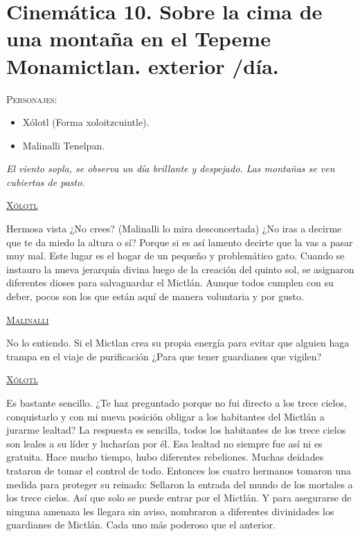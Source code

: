 \documentclass[11pt,letterpaper]{article}
\begin{document}
\section{Cinemática 10. Sobre la cima de una montaña en el Tepeme Monamictlan. exterior /día.}
 \textsc{Personajes}:
 \begin{itemize}
 \item Xólotl (Forma xoloitzcuintle).
	\item Malinalli Tenelpan.
 \end{itemize}
\textit{El viento sopla, se observa un día brillante y despejado.  Las montañas se ven cubiertas de pasto.}

\begin{center}
\textsc{\underline{Xólotl}}
\\
\par
Hermosa vista ¿No crees? (Malinalli lo mira desconcertada) ¿No iras a decirme que te da miedo la altura o sí? Porque si es así lamento decirte que la vas a pasar muy mal. Este lugar es el hogar de un pequeño y problemático gato. Cuando se instauro la nueva jerarquía divina luego de la creación del quinto sol, se asignaron diferentes dioses para salvaguardar el Mictlán. Aunque todos cumplen con su deber, pocos son los que están aquí de manera voluntaria y por gusto.
\\
\par
\textsc{\underline{Malinalli}}
\\
\par
No lo entiendo. Si el Mictlan crea su propia energía para evitar que alguien haga trampa en el viaje de purificación ¿Para que tener guardianes que vigilen?
\\
\par
\textsc{\underline{Xólotl}}
\\
\par
Es bastante sencillo. ¿Te haz preguntado porque no fui directo a los trece cielos, conquistarlo y con mi nueva posición obligar a los habitantes del Mictlán a jurarme lealtad? La respuesta es sencilla, todos los habitantes de los trece cielos son leales a su líder y lucharían por él. Esa lealtad no siempre fue así ni es gratuita. Hace mucho tiempo, hubo diferentes rebeliones. Muchas deidades trataron de tomar el control de todo. Entonces los cuatro hermanos tomaron una medida para proteger su reinado: Sellaron la entrada del mundo de los mortales a los trece cielos. Así que solo se puede entrar por el Mictlán. Y para asegurarse de ninguna amenaza les llegara sin aviso, nombraron a diferentes divinidades los guardianes de Mictlán. Cada uno más poderoso que el anterior. 

\end{center}
\end{document}
